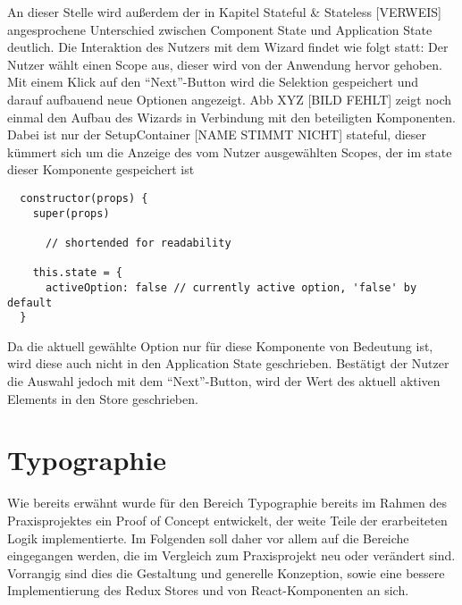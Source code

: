 An dieser Stelle wird außerdem der in Kapitel Stateful \& Stateless [VERWEIS] angesprochene Unterschied zwischen Component State und Application State deutlich. Die Interaktion des Nutzers mit dem Wizard findet wie folgt statt: Der Nutzer wählt einen Scope aus, dieser wird von der Anwendung hervor gehoben. Mit einem Klick auf den “Next”-Button wird die Selektion gespeichert und darauf aufbauend neue Optionen angezeigt.
Abb XYZ [BILD FEHLT] zeigt noch einmal den Aufbau des Wizards in Verbindung mit den beteiligten Komponenten. Dabei ist nur der SetupContainer [NAME STIMMT NICHT] stateful, dieser kümmert sich um die Anzeige des vom Nutzer ausgewählten Scopes, der im state dieser Komponente gespeichert ist

\begin{lstlisting}
  constructor(props) {
    super(props)

	  // shortended for readability

    this.state = {
      activeOption: false // currently active option, 'false' by default
  }
\end{lstlisting}

Da die aktuell gewählte Option nur für diese Komponente von Bedeutung ist, wird diese auch nicht in den Application State geschrieben. Bestätigt der Nutzer die Auswahl jedoch mit dem “Next”-Button, wird der Wert des aktuell aktiven Elements in den Store geschrieben.


\section{Typographie}
Wie bereits erwähnt wurde für den Bereich Typographie bereits im Rahmen des Praxisprojektes ein Proof of Concept entwickelt, der weite Teile der erarbeiteten Logik implementierte.
Im Folgenden soll daher vor allem auf die Bereiche eingegangen werden, die im Vergleich zum Praxisprojekt neu oder verändert sind. Vorrangig sind dies die Gestaltung und generelle Konzeption, sowie eine bessere Implementierung des Redux Stores und von React-Komponenten an sich.

